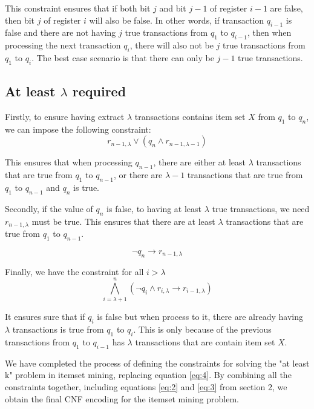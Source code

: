This constraint ensures that if both bit $j$ and bit $j-1$ of register $i-1$ are false,
then bit $j$ of register $i$ will also be false.
In other words, if transaction $q_{i-1}$ is false and there are not having $j$ true transactions from $q_1$ to $q_{i-1}$,
then when processing the next transaction $q_i$, there will also not be $j$ true transactions from $q_1$ to $q_i$.
The best case scenario is that there can only be $j-1$ true transactions.

\subsection{At least $\lambda$ required}

Firstly, to ensure having extract $\lambda$ transactions contains item set $X$ from $q_1$ to $q_n$, we can impose the following constraint:
\begin{equation}
    \label{eq:ensure_lambda_transactions}
    r_{n-1,\lambda} \vee (q_n \wedge r_{n-1,\lambda-1})
\end{equation}

This ensures that when processing $q_{n-1}$, there are either at least $\lambda$ transactions that are true from $q_1$ to $q_{n-1}$,
or there are $\lambda - 1$ transactions that are true from $q_1$ to $q_{n-1}$ and $q_n$ is true.

Secondly, if the value of $q_n$ is false, to having at least $\lambda$ true transactions,
we need $r_{n-1,\lambda}$ must be true.
This ensures that there are at least $\lambda$ transactions that are true from $q_1$ to $q_{n-1}$.

\begin{equation}
    \label{eq:must_have_true_lambda_transactions_before_q_n_false}
    \neg q_n \rightarrow r_{n-1,\lambda}
\end{equation}

Finally, we have the constraint for all $i > \lambda$
\begin{equation}
    \label{eq:at_least_lambda_transactions}
    \bigwedge_{i=\lambda + 1}^{n} \left( \neg q_i \wedge r_{i,\lambda} \rightarrow r_{i-1,\lambda} \right)
\end{equation}

It ensures sure that if $q_i$ is false but when process to it, there are already having $\lambda$ transactions is true from $q_1$ to $q_i$.
This is only because of the previous transactions from $q_1$ to $q_{i-1}$ has $\lambda$ transactions that are contain item set $X$.

We have completed the process of defining the constraints for solving the
"at least k" problem in itemset mining, replacing equation \ref{eq:4}.
By combining all the constraints together, including equations \ref{eq:2} and \ref{eq:3} from section 2,
we obtain the final CNF encoding for the itemset mining problem.